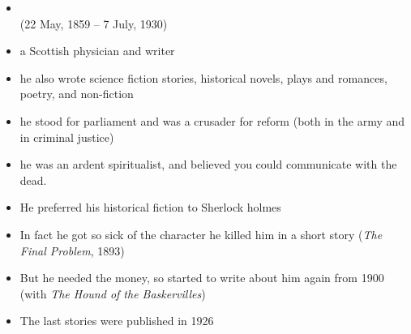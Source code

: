 \documentclass[a4paper,landscape,headrule,footrule,xetex,25pt]{foils}
\begin{document}



\begin{itemize}
\item {}
  \\  (22 May, 1859 – 7 July, 1930)
\item a Scottish physician and writer
\item he also wrote science fiction stories, historical novels, plays and romances, poetry, and non-fiction
\item he stood for parliament and was a crusader for reform (both in
  the army and in criminal justice)
\item he was an ardent spiritualist, and believed you could communicate with the dead.
\end{itemize}


\begin{itemize}
\item He preferred his historical fiction to Sherlock holmes
\item In fact he got so sick of the character he killed him in a short story (\textit{The Final Problem}, 1893)
\item But he needed the money, so started to write about him again from 1900 (with \textit{The Hound of the Baskervilles})
\item The last stories were published in 1926
\end{itemize}


\end{document}
